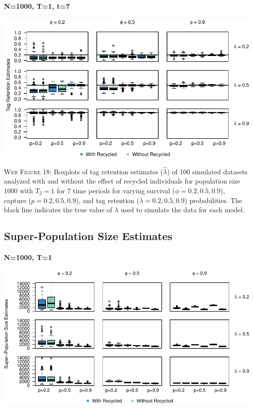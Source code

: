 \documentclass[]{article}
\let\oldparagraph\paragraph
\renewcommand{\paragraph}[1]{\oldparagraph{#1}\mbox{}}
\begin{document}
\paragraph{N=1000, T=1, t=7}\label{n1000-t1-t7-2}

\includegraphics{Appendix_files/figure-latex/figure18_tagretention_GJSTL6-1.pdf}

\textsc{Web Figure 18:} Boxplots of tag retention estimates
(\(\hat{\lambda}\)) of 100 simulated datasets analyzed with and without
the effect of recycled individuals for population size \(1000\) with
\(T_2=1\) for 7 time periods for varying survival
(\(\phi=0.2,0.5,0.9\)), capture (\(p=0.2,0.5,0.9\)), and tag retention
(\(\lambda=0.2,0.5,0.9\)) probabilities. The black line indicates the
true value of \(\lambda\) used to simulate the data for each model.

\newpage

\subsection{Super-Population Size
Estimates}\label{super-population-size-estimates}

\paragraph{N=1000, T=1}\label{n1000-t1-3}

\includegraphics{Appendix_files/figure-latex/figure19_superN_GJSTL1-1.pdf}
\end{document}
